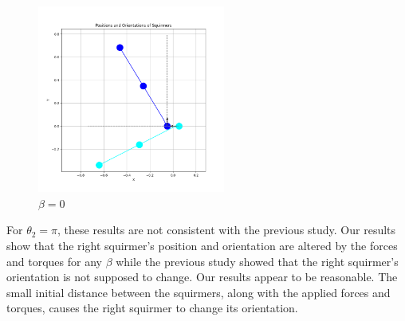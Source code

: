 \documentclass{article}
\begin{document}
\begin{figure}[H]
\begin{minipage}{0.49\textwidth}
        \caption{\footnotesize $\beta = 3$}
    \end{minipage}
    \includegraphics[width=0.55\textwidth]{graphs/simulations/sim_sq_sq/beta0/pi_.png}
    \caption{\footnotesize $\beta = 0$}
\end{figure}
For $\theta_2 = \pi$, these results are not consistent with the previous study\cite{Stark}. 
Our results show that the right squirmer's position
and orientation are altered by the forces and torques for any $\beta$ while the previous study showed that the right squirmer's
orientation is not supposed to change. Our results appear to be reasonable. The small initial 
distance between the squirmers, along with the applied forces and torques, causes the right 
squirmer to change its orientation.
\end{document}
